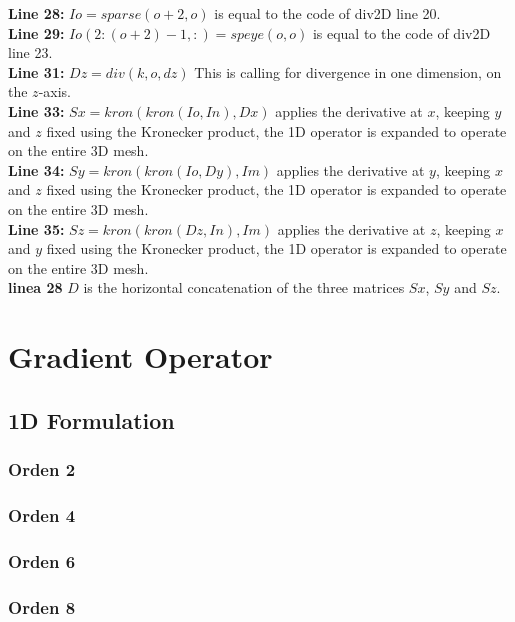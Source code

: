 \textbf{Line 28:} $Io = sparse(o+2,o)$ is equal to the code of div2D line 20.\\

\textbf{Line 29:} $ Io(2:(o + 2) - 1, :) = speye(o, o)$ is equal to the code of div2D line 23.\\

\textbf{Line 31:} $Dz = div(k, o, dz)$ This is calling for divergence in one dimension, on the $z$-axis.\\

\textbf{Line 33:} $Sx = kron(kron(Io, In), Dx)$ applies the derivative at $x$, keeping $y$ and $z$ fixed using the Kronecker product, the 1D operator is expanded to operate on the entire 3D mesh.\\

\textbf{Line 34:} $Sy = kron(kron(Io, Dy), Im)$ applies the derivative at $y$, keeping $x$ and $z$ fixed using the Kronecker product, the 1D operator is expanded to operate on the entire 3D mesh.\\

\textbf{Line 35:} $Sz = kron(kron(Dz, In), Im)$ applies the derivative at $z$, keeping $x$ and $y$ fixed using the Kronecker product, the 1D operator is expanded to operate on the entire 3D mesh.\\

\textbf{linea 28} $D$ is the horizontal concatenation of the three matrices $Sx$, $Sy$ and $Sz$.\\



\section{Gradient Operator}

\subsection{1D Formulation}

\subsubsection{Orden 2}
\subsubsection{Orden 4}
\subsubsection{Orden 6}
\subsubsection{Orden 8}


